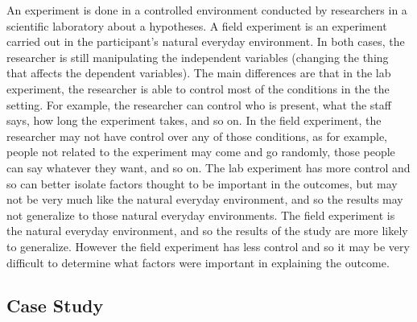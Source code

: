 \documentclass[%
nonumbib,      %
%
]{nrc1}                          %
\begin{document}
An experiment is done in a controlled environment conducted by researchers in a scientific laboratory about a hypotheses. A field experiment is an experiment carried out in the participant's natural everyday environment. In both cases, the researcher is still manipulating the independent variables (changing the thing that affects the dependent variables). The main differences are that in the lab experiment, the researcher is able to control most of the conditions in the the setting. For example, the researcher can control who is present, what the staff says, how long the experiment takes, and so on. In the field experiment, the researcher may not have control over any of those conditions, as for example, people not related to the experiment may come and go randomly, those people can say whatever they want, and so on. The lab experiment has more control and so can better isolate factors thought to be important in the outcomes, but may not be very much like the natural everyday environment, and so the results may not generalize to those natural everyday environments. The field experiment is the natural everyday environment, and so the results of the study are more likely to generalize. However the field experiment has less control and so it may be very difficult to determine what factors were important in explaining the outcome. 

\subsection*{Case Study}


\end{document}
